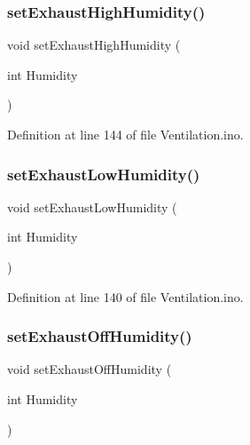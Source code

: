 \mbox{\label{_ventilation_8ino_ad56f26470ecd352a5618a214a5d3c6cc}} 
\subsubsection{\texorpdfstring{setExhaustHighHumidity()}{setExhaustHighHumidity()}}
{\footnotesize\ttfamily void set\+Exhaust\+High\+Humidity (\begin{DoxyParamCaption}\item[{int}]{Humidity }\end{DoxyParamCaption})}



Definition at line 144 of file Ventilation.\+ino.

\mbox{\label{_ventilation_8ino_a6840bb7897c12e21be3235154d43e77e}} 
\subsubsection{\texorpdfstring{setExhaustLowHumidity()}{setExhaustLowHumidity()}}
{\footnotesize\ttfamily void set\+Exhaust\+Low\+Humidity (\begin{DoxyParamCaption}\item[{int}]{Humidity }\end{DoxyParamCaption})}



Definition at line 140 of file Ventilation.\+ino.

\mbox{\label{_ventilation_8ino_aac3755d2cdd7a55948c6446a967dc7e1}} 
\subsubsection{\texorpdfstring{setExhaustOffHumidity()}{setExhaustOffHumidity()}}
{\footnotesize\ttfamily void set\+Exhaust\+Off\+Humidity (\begin{DoxyParamCaption}\item[{int}]{Humidity }\end{DoxyParamCaption})}




